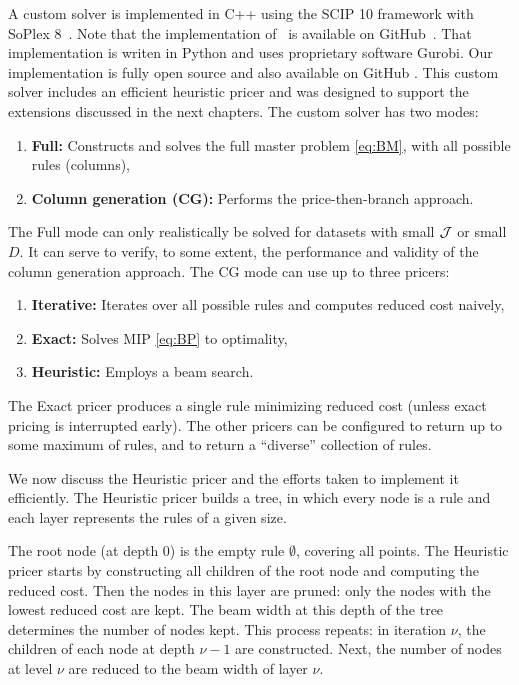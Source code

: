 A custom solver is implemented in C++ using the SCIP 10 framework with SoPlex 8~\cite{hojny_scip_2025}.
Note that the implementation of~\cite{lawless_interpretable_2023} is available on GitHub~\cite{lawless_conlawfaircg_2026}.
That implementation is writen in Python and uses proprietary software Gurobi.
Our implementation is fully open source and also available on GitHub \cite{noauthor_kalkoenrulesets_nodate}.
This custom solver includes an efficient heuristic pricer and was designed to support the extensions discussed in the next chapters.
The custom solver has two modes:
\begin{enumerate}
    \item \textbf{Full:} Constructs and solves the full master problem \eqref{eq:BM}, with all possible rules (columns),
    \item \textbf{Column generation (CG):} Performs the price-then-branch approach.
\end{enumerate}
The Full mode can only realistically be solved for datasets with small $\mathcal{J}$ or small $D$.
It can serve to verify, to some extent, the performance and validity of the column generation approach.
The CG mode can use up to three pricers:
\begin{enumerate}
    \item \textbf{Iterative:} Iterates over all possible rules and computes reduced cost naively,
    \item \textbf{Exact:} Solves MIP \eqref{eq:BP} to optimality,
    \item \textbf{Heuristic:} Employs a beam search.
\end{enumerate}
The Exact pricer produces a single rule minimizing reduced cost (unless exact pricing is interrupted early).
The other pricers can be configured to return up to some maximum of rules, and to return a ``diverse'' collection of rules.

We now discuss the Heuristic pricer and the efforts taken to implement it efficiently.
The Heuristic pricer builds a tree, in which every node is a rule and each layer represents the rules of a given size.

The root node (at depth $0$) is the empty rule $\emptyset$, covering all points.
The Heuristic pricer starts by constructing all children of the root node and computing the reduced cost.
Then the nodes in this layer are pruned: only the nodes with the lowest reduced cost are kept.
The beam width at this depth of the tree determines the number of nodes kept.
This process repeats: in iteration $\nu$, the children of each node at depth $\nu-1$ are constructed.
Next, the number of nodes at level $\nu$ are reduced to the beam width of layer $\nu$.

